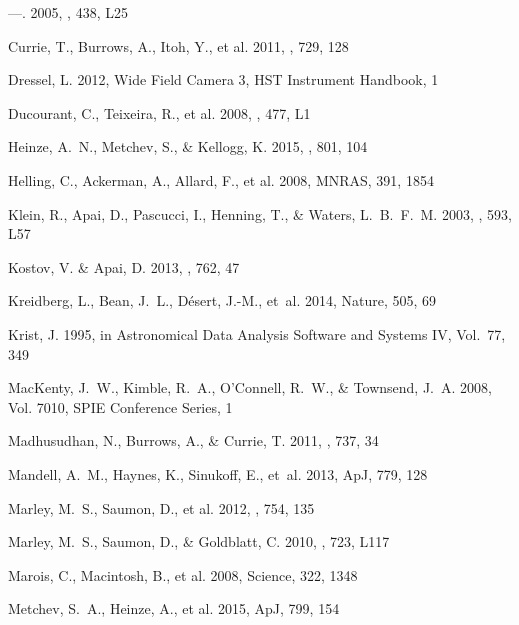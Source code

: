 \documentclass[apj]{emulateapj}
\begin{document}
\begin{thebibliography}{42}
---. 2005, \aap, 438, L25

{Currie}, T., {Burrows}, A., {Itoh}, Y., et al. 2011, \apj, 729, 128

Dressel, L. 2012, Wide Field Camera 3, HST Instrument Handbook, 1

Ducourant, C., Teixeira, R., et al. 2008, \aap, 477, L1

{Heinze}, A.~N., {Metchev}, S., \& {Kellogg}, K. 2015, \apj, 801, 104

Helling, C., Ackerman, A., Allard, F., et al. 2008,
  MNRAS, 391, 1854

{Klein}, R., {Apai}, D., {Pascucci}, I., {Henning}, T., \& {Waters},
  L.~B.~F.~M. 2003, \apjl, 593, L57

{Kostov}, V. \& {Apai}, D. 2013, \apj, 762, 47

Kreidberg, L., Bean, J.~L., D\'{e}sert, J.-M., {et~al.} 2014, Nature, 505, 69

Krist, J. 1995, in Astronomical Data Analysis Software and Systems IV, Vol.~77,
  349

{MacKenty}, J.~W., {Kimble}, R.~A., {O'Connell}, R.~W., \& {Townsend}, J.~A.
  2008,  Vol. 7010,  SPIE
  Conference Series, 1

{Madhusudhan}, N., {Burrows}, A., \& {Currie}, T. 2011, \apj, 737, 34

Mandell, A.~M., Haynes, K., Sinukoff, E., {et~al.} 2013, ApJ, 779, 128

{Marley}, M.~S., {Saumon}, D., et al. 2012, \apj, 754, 135

{Marley}, M.~S., {Saumon}, D., \& {Goldblatt}, C. 2010, \apjl, 723, L117

Marois, C., Macintosh, B., et al. 2008, Science, 322, 1348

Metchev, S.~A., Heinze, A., et al. 2015, ApJ, 799, 154


\end{thebibliography}
\end{document}
